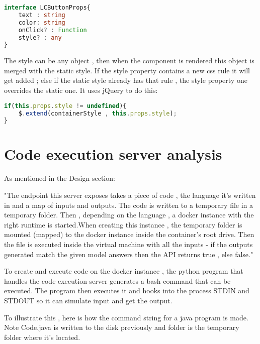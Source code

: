 \begin{lstlisting}[breaklines,language=Typescript,frame=single,basicstyle=\ttfamily,
    stringstyle=\color{red},
    keywordstyle=\color{blue}]
interface LCButtonProps{
    text : string
    color: string
    onClick? : Function
    style? : any
}
\end{lstlisting}

The style can be any object , then when the component is rendered this object is merged with the static style. If the style property contains a new css rule it will get added ; else if the static style already has that rule , the style property one overrides the static one. It uses jQuery to do this:

\begin{lstlisting}[breaklines,language=Typescript,frame=single,basicstyle=\ttfamily,
    stringstyle=\color{red},
    keywordstyle=\color{blue}]
if(this.props.style != undefined){
	$.extend(containerStyle , this.props.style);    
}
\end{lstlisting}

\section{Code execution server analysis}

As mentioned in the Design section:
\begin{displayquote}

"The endpoint this server exposes takes a piece of code , the language it's written in and a map of inputs and outputs. The code is written to a temporary file in a temporary folder. Then , depending on the language , a docker instance with the right runtime is started.When creating this instance , the temporary folder is mounted (mapped) to the docker instance inside the container's root drive. Then the file is executed inside the virtual machine with all the inputs - if the outputs generated match the given model answers then the API returns true , else false."
\end{displayquote}

To create and execute code on the docker instance , the python program that handles the code execution server generates a bash command that can be executed. The program then executes it and hooks into the process STDIN and STDOUT so it can simulate input and get the output.

To illustrate this , here is how the command string for a java program is made. Note Code.java is written to the disk previously and folder is the temporary folder where it's located.

